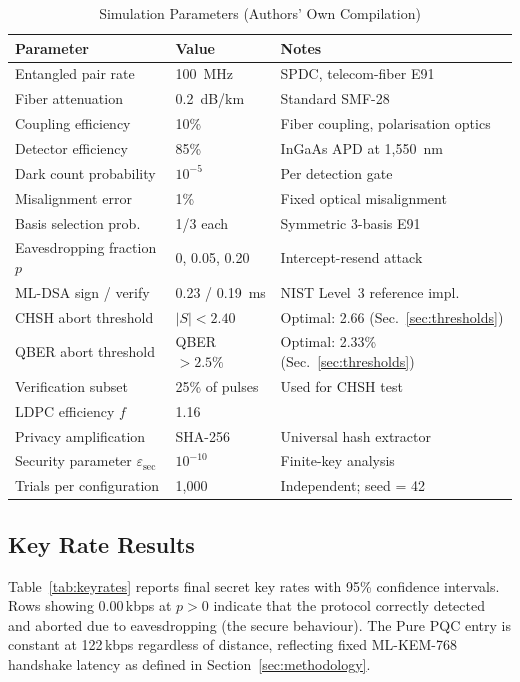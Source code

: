 \documentclass[conference]{IEEEtran}
\begin{document}
\begin{table}[!t]
\caption{Simulation Parameters (Authors' Own Compilation)}
\label{tab:params}
\centering
\begin{tabular}{@{}lll@{}}
\toprule
\textbf{Parameter} & \textbf{Value} & \textbf{Notes} \\
\midrule
Entangled pair rate & 100~MHz & SPDC, telecom-fiber E91~\cite{poppe2004} \\
Fiber attenuation & 0.2~dB/km & Standard SMF-28 \\
Coupling efficiency & 10\% & Fiber coupling, polarisation optics \\
Detector efficiency & 85\% & InGaAs APD at 1{,}550~nm \\
Dark count probability & $10^{-5}$ & Per detection gate \\
Misalignment error & 1\% & Fixed optical misalignment \\
Basis selection prob. & 1/3 each & Symmetric 3-basis E91 \\
Eavesdropping fraction $p$ & 0, 0.05, 0.20 & Intercept-resend attack \\
ML-DSA sign / verify & 0.23 / 0.19~ms & NIST Level~3 reference impl. \\
CHSH abort threshold & $|S| < 2.40$ & Optimal: 2.66 (Sec.~\ref{sec:thresholds}) \\
QBER abort threshold & QBER $> 2.5\%$ & Optimal: 2.33\% (Sec.~\ref{sec:thresholds}) \\
Verification subset & 25\% of pulses & Used for CHSH test \\
LDPC efficiency $f$ & 1.16 & \cite{elkouss2011} \\
Privacy amplification & SHA-256 & Universal hash extractor \\
Security parameter $\varepsilon_{\mathrm{sec}}$ & $10^{-10}$ & Finite-key analysis \\
Trials per configuration & 1{,}000 & Independent; seed = 42 \\
\bottomrule
\end{tabular}
\end{table}

\subsection{Key Rate Results}
Table~\ref{tab:keyrates} reports final secret key rates with 95\% confidence intervals. Rows showing $0.00$\,kbps at $p > 0$ indicate that the protocol correctly detected and aborted due to eavesdropping (the secure behaviour). The Pure PQC entry is constant at 122\,kbps regardless of distance, reflecting fixed ML-KEM-768 handshake latency as defined in Section~\ref{sec:methodology}.
\end{document}
